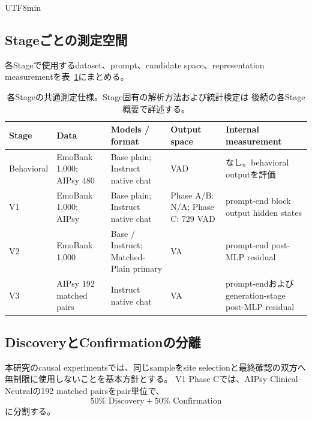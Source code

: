 \documentclass{article} %
\begin{document}
\begin{CJK*}{UTF8}{min}
\subsection{Stageごとの測定空間}
\label{app:measurement_spaces}

各Stageで使用するdataset、prompt、candidate space、representation measurementを表~\ref{tab:measurement_spaces}にまとめる。

\begin{table}[htbp]
\centering
\scriptsize
\caption{各Stageの共通測定仕様。Stage固有の解析方法および統計検定は
後続の各Stage概要で詳述する。}
\label{tab:measurement_spaces}
\begin{tabularx}{\linewidth}{
@{}
>{\raggedright\arraybackslash}p{1.2cm}
>{\raggedright\arraybackslash}p{2.1cm}
>{\raggedright\arraybackslash}p{2.0cm}
>{\raggedright\arraybackslash}p{1.7cm}
>{\raggedright\arraybackslash}X
@{}
}
\toprule
\textbf{Stage} &
\textbf{Data} &
\textbf{Models / format} &
\textbf{Output space} &
\textbf{Internal measurement} \\
\midrule
Behavioral &
EmoBank 1,000;
AIPsy 480 &
Base plain;
Instruct native chat &
729 VAD &
なし。behavioral outputを評価 \\

V1 &
EmoBank 1,000;
AIPsy &
Base plain;
Instruct native chat &
Phase A/B: N/A;
Phase C: 729 VAD &
prompt-end block output hidden states \\

V2 &
EmoBank 1,000 &
Base / Instruct;
Matched-Plain primary &
81 VA &
prompt-end post-MLP residual \\

V3 &
AIPsy 192 matched pairs &
Instruct native chat &
81 VA &
prompt-endおよびgeneration-stage post-MLP residual \\
\bottomrule
\end{tabularx}
\end{table}


\subsection{DiscoveryとConfirmationの分離}
\label{app:discovery_confirmation}

本研究のcausal experimentsでは、同じsampleをsite selectionと最終確認の双方へ無制限に使用しないことを基本方針とする。
V1 Phase Cでは、AIPsy Clinical--Neutralの192 matched pairsをpair単位で、
\[
50\%\text{ Discovery}
+
50\%\text{ Confirmation}
\]
に分割する。


\end{CJK*}
\end{document}
